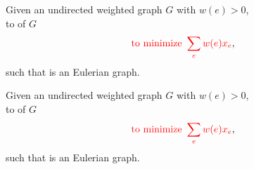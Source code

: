 \begin{frame}{}
  \begin{definition}
    \begin{center}
      Given an undirected weighted graph $G$ with $w(e) > 0$, \\
      to  of $G$ 
      \[
	\textcolor{red}{\text{to minimize } \sum_{e} w(e) x_e},
      \]
      such that  is an Eulerian graph.
    \end{center}
  \end{definition}

  \pause
  \begin{center}
  \end{center}

  \pause
  \begin{definition}
    \begin{center}
      Given an undirected weighted graph $G$ with $w(e) > 0$, \\
      to  of $G$ 
      \[
	\textcolor{red}{\text{to minimize } \sum_{e} w(e) x_e},
      \]
      such that  is an Eulerian graph.
    \end{center}
  \end{definition}
\end{frame}

\begin{frame}{}
  

\end{frame}

